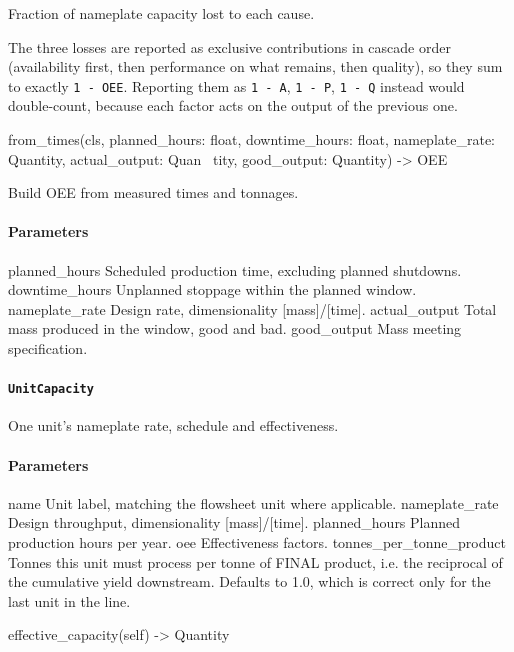 \documentclass[10pt,a4paper,twoside]{report}
\begin{document}
Fraction of nameplate capacity lost to each cause.

The three losses are reported as exclusive contributions in cascade order (availability first, then performance on what remains, then quality), so they sum to exactly \texttt{1 - OEE}. Reporting them as \texttt{1 - A}, \texttt{1 - P}, \texttt{1 - Q} instead would double-count, because each factor acts on the output of the previous one.

\begin{verbatimsmall}
from_times(cls, planned_hours: float, downtime_hours: float, nameplate_rate: Quantity, actual_output: Quan
    \ tity, good_output: Quantity) -> OEE
\end{verbatimsmall}

Build OEE from measured times and tonnages.

\paragraph*{Parameters}

planned\_hours Scheduled production time, excluding planned shutdowns. downtime\_hours Unplanned stoppage within the planned window. nameplate\_rate Design rate, dimensionality [mass]/[time]. actual\_output Total mass produced in the window, good and bad. good\_output Mass meeting specification.

\paragraph{\texttt{UnitCapacity}}

One unit's nameplate rate, schedule and effectiveness.

\paragraph*{Parameters}

name Unit label, matching the flowsheet unit where applicable. nameplate\_rate Design throughput, dimensionality [mass]/[time]. planned\_hours Planned production hours per year. oee Effectiveness factors. tonnes\_per\_tonne\_product Tonnes this unit must process per tonne of FINAL product, i.e. the reciprocal of the cumulative yield downstream. Defaults to 1.0, which is correct only for the last unit in the line.

\begin{verbatimsmall}
effective_capacity(self) -> Quantity
\end{verbatimsmall}
\end{document}
